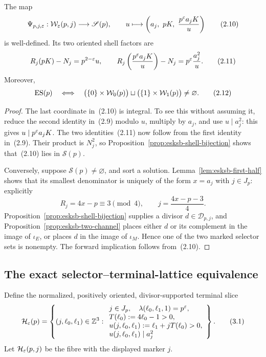 \begin{proposition}\label{prop:esksb-reconstruct}
The map
\begin{equation}
 \Psi_{p,j,\varepsilon}:\mathcal W_\varepsilon(p,j)\longrightarrow\mathscr S(p),
 \qquad
 u\longmapsto
 \left(a_j,\ pK,\ \frac{p^\varepsilon a_jK}{u}\right)             \tag{2.10}
\end{equation}
is well-defined.  Its two oriented shell factors are
\begin{equation}
 R_j(pK)-N_j=p^{2-\varepsilon}u,
 \qquad
 R_j\left(\frac{p^\varepsilon a_jK}{u}\right)-N_j
 =p^\varepsilon\frac{a_j^2}{u}.                                    \tag{2.11}
\end{equation}
Moreover,
\begin{equation}
 \operatorname{ES}(p)\quad\Longleftrightarrow\quad
 \bigl(\{0\}\times\mathcal W_0(p)\bigr)\sqcup
 \bigl(\{1\}\times\mathcal W_1(p)\bigr)\neq\varnothing.   \tag{2.12}
\end{equation}
\end{proposition}

\begin{proof}
The last coordinate in~(2.10) is integral.  To see this without assuming it,
reduce the second identity in~(2.9) modulo \(u\), multiply by \(a_j\), and
use \(u\mid a_j^2\): this gives \(u\mid p^\varepsilon a_jK\).
The two identities~(2.11) now follow from the first identity in~(2.9).
Their product is \(N_j^2\), so Proposition~\ref{prop:esksb-shell-bijection}
shows that~(2.10) lies in \(\mathscr S(p)\).

Conversely, suppose \(\mathscr S(p)\neq\varnothing\), and sort a solution.
Lemma~\ref{lem:esksb-first-half} shows that its smallest denominator is uniquely
of the form \(x=a_j\) with \(j\in J_p\): explicitly
\[
 R_j=4x-p\equiv3\pmod4,
 \qquad j=\frac{4x-p-3}{4}.
\]
Proposition~\ref{prop:esksb-shell-bijection} supplies a divisor
\(d\in\mathscr D_{p,j}\), and Proposition~\ref{prop:esksb-two-channel} places
either \(d\) or its complement in the image of \(\iota_E\), or places \(d\)
in the image of \(\iota_M\).  Hence one of the two marked selector sets is
nonempty.  The forward implication follows from~(2.10).
\end{proof}

\subsection{The exact selector--terminal-lattice equivalence}

Define the normalized, positively oriented, divisor-supported terminal slice
\begin{equation}
 \mathcal H_\varepsilon(p)=
 \left\{(j,\ell_0,\ell_1)\in\mathbb Z^3:
 \begin{array}{l}
 j\in J_p,\quad \lambda(\ell_0,\ell_1,1)=p^\varepsilon,\\
 T(\ell_0):=4\ell_0-1>0,\\
 u(j,\ell_0,\ell_1):=\ell_1+jT(\ell_0)>0,\\
 u(j,\ell_0,\ell_1)\mid a_j^2
 \end{array}
 \right\}.                                                   \tag{3.1}
\end{equation}
Let \(\mathcal H_\varepsilon(p,j)\) be the fibre with the displayed marker \(j\).

